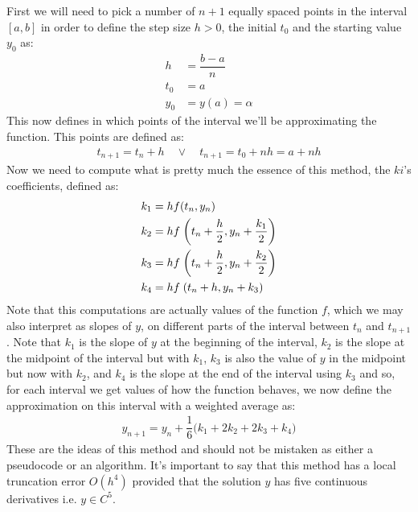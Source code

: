 \documentclass[12pt,twoside]{extarticle}
\begin{document}
    First we will need to pick a number of $n+1$ equally spaced points in the interval $[a,b]$ in order to define the step size $h>0$, the initial $t_0$ and the starting value $y_0$ as:
    \begin{align*}
        h&=\dfrac{b-a}{n} \\
        t_0 &= a \\
        y_0 &= y(a)=\alpha
    \end{align*}
    This now defines in which points of the interval we'll be approximating the function. This points are defined as:
    \begin{align}
        t_{n+1}=t_n + h \quad \lor \quad t_{n+1} = t_0 +nh = a +nh
    \end{align}
    Now we need to compute what is pretty much the essence of this method, the $ki$'s coefficients, defined as:
    \begin{align*}
        k_1&=hf(t_n,y_n) \\
        k_2&=hf\hspace{0.1em} \left(t_n+\dfrac{h}{2}, y_n + \dfrac{k_1}{2}\right)\\
        k_3&=hf\hspace{0.1em} \left(t_n+\dfrac{h}{2}, y_n + \dfrac{k_2}{2}\right)\\
        k_4&=hf\hspace{0.1em} \left(t_n+h, y_n + k_3\right)
    \end{align*}
    Note that this computations are actually values of the function $f$, which we may also interpret as slopes of $y$, on different parts of the interval between $t_n$ and $t_{n+1}$. Note that $k_1$ is the slope of $y$ at the beginning of the interval, $k_2$ is the slope at the midpoint of the interval but with $k_1$, $k_3$ is also the value of $y$ in the midpoint but now with $k_2$, and $k_4$ is the slope at the end of the interval using $k_3$ and so, for each interval we get values of how the function behaves, we now define the approximation on this interval with a weighted average as:
    \begin{align*}
        y_{n+1}=y_n + \dfrac{1}{6}\Big(k_1+2k_2+2k_3+k_4\Big)
    \end{align*}
    These are the ideas of this method and should not be mistaken as either a pseudocode or an algorithm. It's important to say that this method has a local truncation error $O(h^4)$ provided that the solution $y$ has five continuous derivatives i.e. $y\in C^5$.
    
\end{document}
